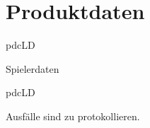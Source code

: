 \chapter{Produktdaten}

\setcounter{pdc}{10}

\begin{description}[leftmargin=0cm]

	\begin{lhp}{pdc}{LD}{}
		\item [Spielerdaten]
	\end{lhp}
	
	\begin{lhp}{pdc}{LD}{}
		\item [Ausfälle sind zu protokollieren.]
	\end{lhp}

\end{description}